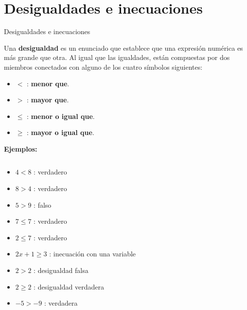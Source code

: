 \documentclass[9pt, aspectratio=169]{beamer}
\begin{document}
\section{Desigualdades e inecuaciones}
\begin{frame}{Desigualdades e inecuaciones}
    \begin{definition}[Desigualdad]
        Una \textbf{desigualdad} es un enunciado que establece que una expresión numérica es más grande que otra. Al igual que las igualdades, están compuestas por dos miembros conectados con alguno de los cuatro símbolos siguientes:
        \begin{multicols}{2}
            \begin{itemize}
                \item $<$ : \textbf{menor que}.
                \item $>$ : \textbf{mayor que}.
                \item $\leq$ : \textbf{menor o igual que}.
                \item $\geq$ : \textbf{mayor o igual que}.
            \end{itemize}
        \end{multicols}
    \end{definition}
\pause

\textbf{Ejemplos:}
\begin{columns}
\begin{multicols}{2}
\begin{itemize}
\item $4 < 8$ : verdadero
\item $8 > 4$ : verdadero
\item $5 > 9$ : falso
\item $7 \leq 7$ : verdadero
\item $2 \leq 7 $ : verdadero
\item $2 x + 1 \geq 3$ : inecuación con una variable
\item $2 > 2$ : desigualdad falsa
\item $2 \geq 2$ : desigualdad verdadera
\item $-5 > -9$ : verdadera
\end{itemize}
\end{multicols}
\end{columns}
\end{frame}
\end{document}
